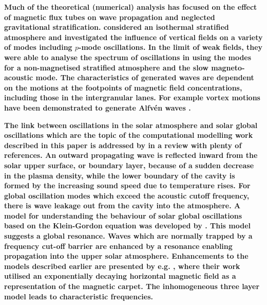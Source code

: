 \documentclass[linenumbers]{aastex63}
\newcommand{\bcr}{\bf\color{red}} %
\begin{document}
{\bcr
 Much of the theoretical (numerical) analysis has focused on the effect of magnetic flux tubes on wave propagation and neglected gravitational stratification. \citet{Hasan1992} considered an isothermal stratified atmosphere and investigated the influence of vertical fields on a variety of modes including $p$-mode oscillations. In the limit of weak fields, they were able to analyse the spectrum of oscillations in using the modes for a non-magnetised stratified atmosphere and the slow magneto-acoustic mode.  The characteristics of generated waves are dependent on the motions at the footpoints of magnetic field concentrations, including those in the intergranular lanes. For example vortex motions have been demonstrated to generate Alfv\'en waves \citet{Fedun2009b}.  
}

{\bcr
The link between oscillations in the solar atmosphere and solar global oscillations which are the topic of the computational modelling work described in this paper is addressed by \citet{Erdelyi2006} in a review with plenty of references.
 An outward propagating wave is reflected inward from the solar upper surface, or boundary layer, because of a sudden decrease in the plasma density, while the lower boundary of the cavity is formed by the increasing sound speed due to temperature rises. For global oscillation modes which exceed the acoustic cutoff frequency, there is wave leakage out from the cavity into the atmosphere. A model for understanding the behaviour of solar global oscillations based on the Klein-Gordon equation was developed by \citet{Taroyan2008}. This model suggests a global resonance. Waves which are normally trapped by a frequency cut-off barrier are enhanced by a resonance enabling propagation into the upper solar atmosphere. Enhancements to the models described earlier are presented by e.g. \citet{Pinter2007}, where their work utilised an exponentially decaying horizontal magnetic field as a representation of the magnetic carpet. The inhomogeneous three layer model leads to characteristic frequencies.
 }
\end{document}
